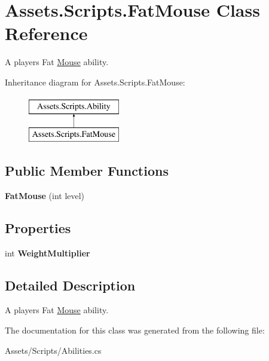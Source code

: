 \hypertarget{class_assets_1_1_scripts_1_1_fat_mouse}{}\section{Assets.\+Scripts.\+Fat\+Mouse Class Reference}
\label{class_assets_1_1_scripts_1_1_fat_mouse}


A player\textquotesingle{}s Fat \hyperlink{class_mouse}{Mouse} ability.  


Inheritance diagram for Assets.\+Scripts.\+Fat\+Mouse\+:\begin{figure}[H]
\begin{center}
\leavevmode
\includegraphics[height=2.000000cm]{class_assets_1_1_scripts_1_1_fat_mouse}
\end{center}
\end{figure}
\subsection*{Public Member Functions}
\begin{DoxyCompactItemize}
\item 
{\bfseries Fat\+Mouse} (int level)\hypertarget{class_assets_1_1_scripts_1_1_fat_mouse_a249796df95a8fa3bcb1f668df537b318}{}\label{class_assets_1_1_scripts_1_1_fat_mouse_a249796df95a8fa3bcb1f668df537b318}

\end{DoxyCompactItemize}
\subsection*{Properties}
\begin{DoxyCompactItemize}
\item 
int {\bfseries Weight\+Multiplier}\hypertarget{class_assets_1_1_scripts_1_1_fat_mouse_af1a59b03e274c1b05d8f4acee81b7b26}{}\label{class_assets_1_1_scripts_1_1_fat_mouse_af1a59b03e274c1b05d8f4acee81b7b26}

\end{DoxyCompactItemize}


\subsection{Detailed Description}
A player\textquotesingle{}s Fat \hyperlink{class_mouse}{Mouse} ability. 



The documentation for this class was generated from the following file\+:\begin{DoxyCompactItemize}
\item 
Assets/\+Scripts/Abilities.\+cs\end{DoxyCompactItemize}
